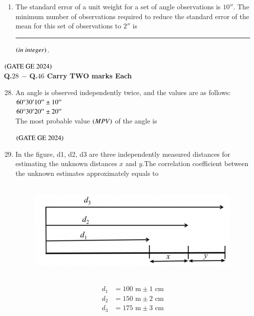 \documentclass[journal,12pt,onecolumn]{IEEEtran}
\theoremstyle{remark}
\begin{document}
\begin{enumerate}
\item The standard error of a unit weight for a set of angle observations is $10''$.
The minimum number of observations required to reduce the standard error of the mean for this set of observations to $2''$ is \rule{2cm}{0.5mm} $\brak{in\ integer}$.\\
\end{enumerate}
\hfill $\brak{\text{GATE GE 2024}}$
\bigskip
\\
\textbf{Q.$28$ $-$ Q.$46$ Carry TWO marks Each}\\
\begin{enumerate}
\setcounter{enumi}{27}
\item An angle is observed independently twice, and the values are as follows:\\
$60\degree30'10'' \pm 10''$\\
$60\degree30'20'' \pm 20''$\\
The most probable value $\brak{MPV}$ of the angle is
\begin{enumerate}
\end{enumerate}
\hfill $\brak{\text{GATE GE 2024}}$
\bigskip
\item In the figure, d1, d2, d3 are three independently measured distances for estimating the unknown distances $x$ and $y$.The correlation coefficient between the unknown estimates approximately equals to\\
\\

\begin{figure}[H]
    \centering
    \includegraphics[width=0.5\columnwidth]{figs/fig5.png}
    \caption{}
    \label{figs:fig5}
\end{figure}\\

\begin{align*}
d_1 &= 100 \text{ m} \pm 1 \text{ cm} \\
d_2 &= 150 \text{ m} \pm 2 \text{ cm} \\
d_3 &= 175 \text{ m} \pm 3 \text{ cm}
\end{align*}


\end{enumerate}
\end{document}
